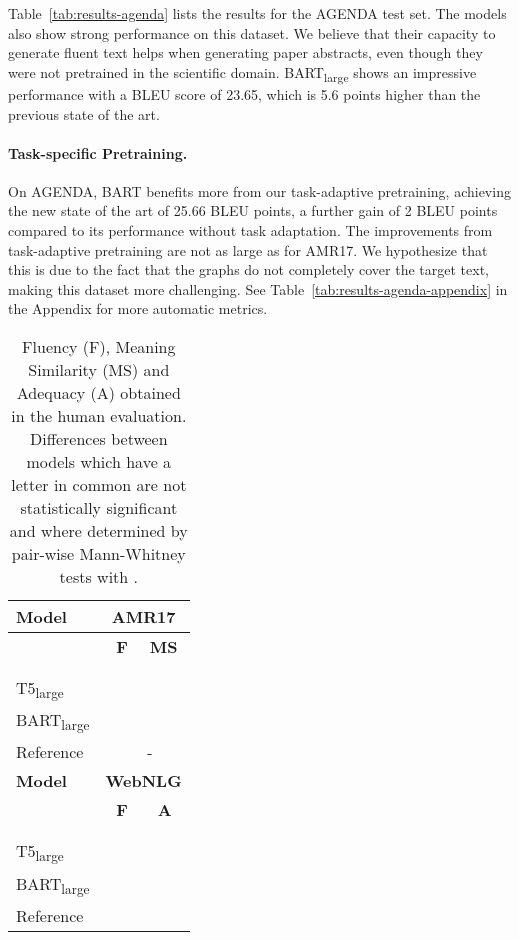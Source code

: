 \documentclass[11pt,a4paper]{article}
\begin{document}
\begin{table*}[t]
Table~\ref{tab:results-agenda} lists the results for the AGENDA test set. The models also show strong performance on this dataset. We believe that their capacity to generate fluent text helps when generating paper abstracts, even though they were not pretrained in the scientific domain. BART\textsubscript{large} shows an impressive performance with a BLEU score of 23.65, which is 5.6 points higher than the previous state of the art.

\paragraph{Task-specific Pretraining.} On AGENDA, BART benefits more from our task-adaptive pretraining, achieving the new state of the art of 25.66 BLEU points, a further gain of 2 BLEU points compared to its performance without task adaptation. The improvements from task-adaptive pretraining are not as large as for AMR17. We hypothesize that this is due to the fact that the graphs do not completely cover the target text, making this dataset more challenging. See Table~\ref{tab:results-agenda-appendix} in the Appendix for more automatic metrics. 



\begin{table}[t]
\centering
{\renewcommand{\arraystretch}{0.9}
\setlength{\belowrulesep}{0pt}
\setlength{\aboverulesep}{0pt}
\begin{tabular}{lll} 
\toprule
\textbf{Model} & \multicolumn{2}{c}{\textbf{AMR17}}  \\
\midrule
& \, \,\textbf{F} & \,\textbf{MS} \\
\midrule
\citet{mager2020gpttoo} &&  \\
\citet{harkous2020text} &&  \\
T5\textsubscript{large} &&  \\
BART\textsubscript{large} &&  \\
Reference && - \\
\midrule
\textbf{Model} & \multicolumn{2}{c}{\textbf{WebNLG}}  \\
 \midrule
& \, \,\textbf{F} & \, \,\textbf{A} \\
\midrule
 \citet{castro-ferreira-etal-2019-neural} &&  \\
 \citet{harkous2020text} &&  \\
 T5\textsubscript{large} &&  \\
BART\textsubscript{large} &&  \\
Reference &&  \\
\bottomrule
\end{tabular}}
\vspace{-1mm}
\caption{Fluency (F), Meaning Similarity (MS) and Adequacy (A) obtained in the human evaluation. Differences between models which have a letter in common are not statistically significant and where determined by pair-wise Mann-Whitney tests with .}
\label{tab:humanevevaluation}
\end{table}


\end{table*}
\end{document}
